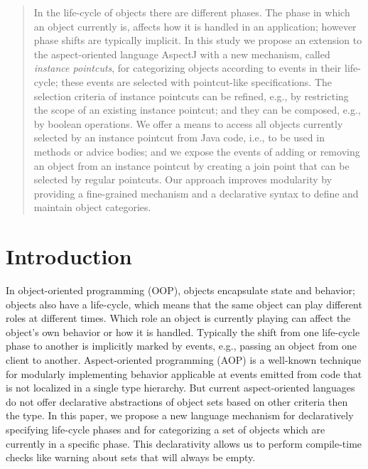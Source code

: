 \maketitle

\begin{abstract}
In the life-cycle of objects there are different phases. The phase in which an object currently is, affects how it is handled in an application; however phase shifts are typically implicit.
In this study we propose an extension to the aspect-oriented language AspectJ with a new mechanism, called \emph{instance pointcuts}, for categorizing objects according to events in their life-cycle; these events are selected with pointcut-like specifications.
The selection criteria of instance pointcuts can be refined, e.g., by restricting the scope of an existing instance pointcut; and they can be composed, e.g., by boolean operations.
We offer a means to access all objects currently selected by an instance pointcut from Java code, i.e., to be used in methods or advice bodies; and we expose the events of adding or removing an object from an instance pointcut by creating a join point that can be selected by regular pointcuts.
Our approach improves modularity by providing a fine-grained mechanism and a declarative syntax to define and maintain object categories.
\end{abstract}

\section{Introduction}
In object-oriented programming (OOP), objects encapsulate state and behavior; objects also have a life-cycle, which means that the same object can play different roles at different times.
Which role an object is currently playing can affect the object's own behavior or how it is handled.
Typically the shift from one life-cycle phase to another is implicitly marked by events, e.g., passing an object from one client to another.
Aspect-oriented programming (AOP) is a well-known technique for modularly implementing behavior applicable at events emitted from code that is not localized in a single type hierarchy.
But current aspect-oriented languages do not offer declarative abstractions of object sets based on other criteria then the type.
In this paper, we propose a new language mechanism for declaratively specifying life-cycle phases and for categorizing a set of objects which are currently in a specific phase. This declarativity allows us to perform compile-time checks like warning about sets that will always be empty. 

